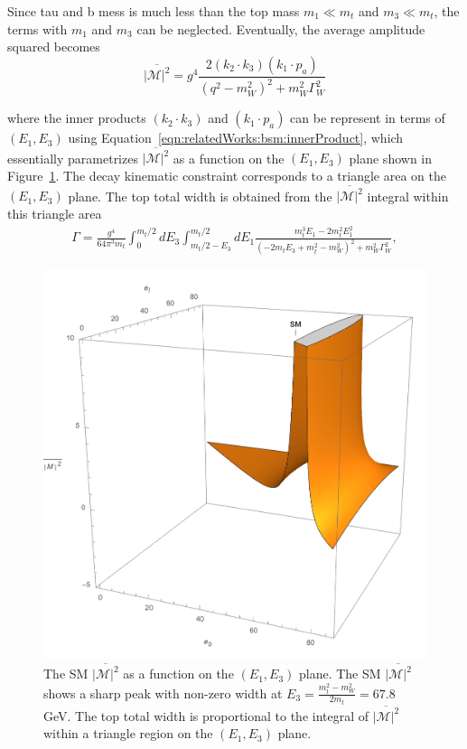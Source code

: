 \noindent Since tau and b mess is much less than the top mass $m_1 \ll m_t $ and $m_3 \ll m_t$, the terms with $m_1$ and $m_3$ can be neglected. Eventually, the average amplitude squared becomes
\begin{equation}
	\overline{ |\mathcal{M}|^2 } =  g^4 \frac{2  (  k_2 \cdot k_3) (  k_1 \cdot p_a) }{ (  q^2-m^2_{W})^2 +  m^2_W \Gamma^2_W }  
    \label{eqn:relatedWorks:bsm:smTopDecay:smTopDecay:m2}
\end{equation}

\noindent where the inner products $(  k_2 \cdot k_3)$ and $ (  k_1 \cdot p_a) $ can be represent in terms of $(E_1,E_3)$ using Equation~\ref{eqn:relatedWorks:bsm:innerProduct}, which essentially parametrizes $\overline{ |\mathcal{M}|^2 } $ as a function on the $(E_1,E_3)$ plane shown in Figure~\ref{fig:relatedWorks:bsm:smTopDecay:smM2}. The decay kinematic constraint corresponds to a triangle area on the  $(E_1,E_3)$ plane. The top total width is obtained from the $\overline{ |\mathcal{M}|^2 } $ integral within this triangle area
\begin{equation}
    \begin{split}
         \Gamma = \frac{g^4}{64 \pi^3 m_t} \int_{0}^{m_t/2} d E_3 \int_{m_t/2-E_3}^{m_t/2} d E_1 \frac{m_t^3 E_1 - 2 m_t^2 E_1^2}{(-2 m_t E_3  + m_t^2  -m_W^2)^2 + m^2_W \Gamma^2_W},
    \end{split}
\end{equation}



\begin{figure}
\centering
    \includegraphics[width=0.4 \textwidth]{chapters/RelatedWorks/sectionBSM/figures/SM.png}
    \caption{The SM $\overline{ |\mathcal{M}|^2 } $ as a function on the $(E_1,E_3)$ plane. The SM $\overline{ |\mathcal{M}|^2 } $  shows a sharp peak with non-zero width at $E_3 = \frac{m^2_t - m^2_W}{2 m_t} = 67.8 $ GeV. The top total width is proportional to the integral of $\overline{ |\mathcal{M}|^2 } $ within a triangle region on the $(E_1,E_3)$ plane. }
    \label{fig:relatedWorks:bsm:smTopDecay:smM2}
\end{figure}







